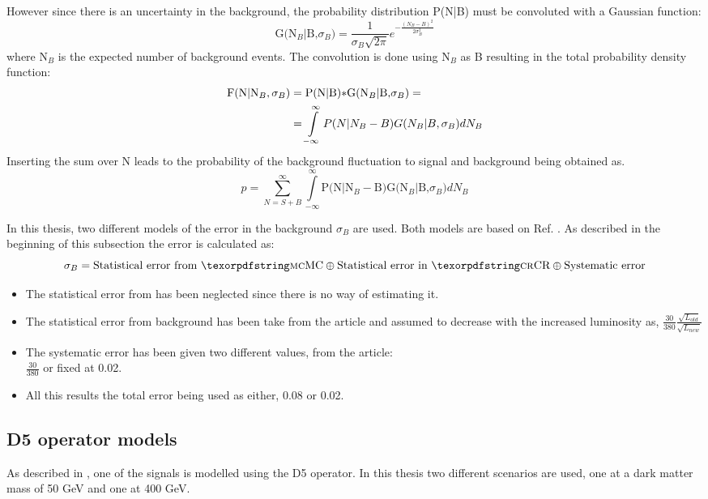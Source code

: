 However since there is an uncertainty in the background, the probability distribution P(N|B) must be convoluted with a Gaussian function:
\begin{equation}
 \text{G(N$_B$|B,$\sigma_B$)}=\frac{1}{\sigma_B \sqrt{2 \pi}} e^{-\frac{(N_B-B)^2}{2\sigma_B^2}}
\end{equation}
where N$_B$ is the expected number of background events. The convolution is done using N$_B$ as B resulting in the total probability density function:
\begin{align}
\text{F(N|N$_B$},\sigma_B) &= \text{P(N|B)$\ast$G(N$_B$|B,$\sigma_B$)}= \notag \\
&=\int\limits_{-\infty}^{\infty}P(N|N_B - B)G(N_B|B,\sigma_B) dN_B
\end{align}
Inserting the sum over N leads to the probability of the background fluctuation to signal and background being obtained as.
\begin{equation}
p = \sum\limits_{N=S+B}^{\infty} \int\limits_{-\infty}^{\infty} \text{P(N|N$_B - $B)G(N$_B$|B,$\sigma_B$)} dN_B
\end{equation}

In this thesis, two different models of the error in the background $\sigma_B$ are used.   
Both models are based on Ref. \citep{ATLAS-CONF-2012-147}. As described in the beginning of this subsection the error is calculated as:
\begin{equation*}
\sigma_B = \text{Statistical error from \abbrMC} \oplus \text{Statistical error in \abbrCR} \oplus \text{Systematic error}
\end{equation*}

\begin{itemize}
\item The statistical error from \abbrMC has been neglected since there is no way of estimating it.
\item The statistical error from background \abbrCR has been take from the article and assumed to decrease with the increased luminosity as, $\frac{30}{380} \frac{\sqrt{L_{old}}}{\sqrt{L_{new}}}$
\item The systematic error has been given two different values, from the article:\\ $\frac{30}{380}$ or fixed at 0.02.
\item All this results the total error being used as either, 0.08 or 0.02. 
\end{itemize}

\subsection{D5 operator models}\label{sec:signal:subsec:d5}
As described in , one of the signals is modelled using the D5 operator. In this thesis two different scenarios are used, one at a dark matter mass of 50 GeV and one at 400 GeV.

